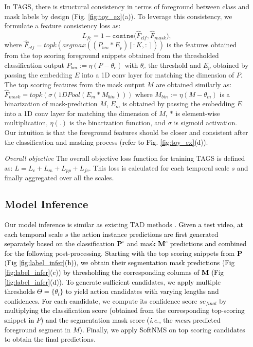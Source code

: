 \documentclass[runningheads]{llncs}
\newcommand{\ie}{\textit{i.e.}}
\newcommand{\shortmodelname}{TAGS}
\begin{document}
{\color{black}
In {\shortmodelname}, there is structural consistency {in terms of foreground} between class and mask labels by design (Fig. \ref{fig:toy_ex}(a)).
To leverage this consistency, we formulate a feature consistency loss as:
\begin{equation}
     L_{fc} = 1 - \texttt{cosine}\Big( 
    \hat{F}_{clf},
    \hat{F}_{mask}
    \Big),
\label{eq:clmask}
\end{equation}
where $\hat{F}_{clf} = topk(argmax((P_{bin}*E_{p})[:K,:]))$ is the features obtained from the top scoring foreground snippets obtained from the thresholded classification output $P_{bin} := \eta(P - \theta_{c})$
with $\theta_{c}$ the threshold and $E_{p}$ obtained by passing the embedding $E$ into a 1D conv layer for matching the dimension of $P$.
The top scoring features from the mask output $M$ are obtained similarly as:
$\hat{F}_{mask} = topk(\sigma(1DPool(E_{m}*M_{bin})))$
where $M_{bin} := \eta(M - \theta_{m})$ is a binarization of mask-prediction $M$, $E_{m}$ is obtained by passing the embedding $E$ into a 1D conv layer for matching the dimension of $M$, $*$ is element-wise multiplication, $\eta(.)$ is the binarization function, and $\sigma$ is sigmoid activation.
Our intuition is that the foreground features should be closer and consistent after the classification and masking process \textcolor{black}{(refer to Fig. \ref{fig:toy_ex}(d))}.
}

\noindent\textit{Overall objective } 
The overall objective loss function for training {\shortmodelname} is defined as:
$L = L_{c} + L_{m} + L_{pp} + L_{fc}$. This loss is calculated for each temporal scale $s$ and finally aggregated over all the scales.


\subsection{Model Inference}
Our model inference is similar as existing TAD methods \cite{lin2019bmn,xu2020g}.
\textcolor{black}{Given a test video, at each temporal scale $s$ the action instance predictions are first generated separately based on the classification $\bm{P}^{s}$ and mask $\bm{M}^{s}$ predictions and combined for the following post-processing.
Starting with the top scoring snippets from $\bm{P}$ (Fig \ref{fig:label_infer}(b)),
we obtain their segmentation mask predictions (Fig \ref{fig:label_infer}(c))
by thresholding the corresponding columns of $\bm{M}$ (Fig \ref{fig:label_infer}(d)).
To generate sufficient candidates,
we apply multiple thresholds ${\Theta}=\{\theta_i\}$
to yield action candidates with varying lengths and confidences.
For each candidate, we compute its confidence score $sc_{final}$
by multiplying the classification score \textcolor{black}{(obtained from the corresponding top-scoring snippet in $P$)}
and the \textcolor{black}{segmentation mask score (\ie,  the {\em mean} predicted foreground segment in $M$)}.
Finally, we apply SoftNMS \cite{bodla2017soft} on top scoring candidates to obtain the final predictions.}
\end{document}
